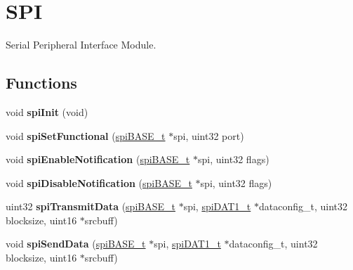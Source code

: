 \hypertarget{group__SPI}{}\section{S\+PI}
\label{group__SPI}


Serial Peripheral Interface Module.  


\subsection*{Functions}
\begin{DoxyCompactItemize}
\item 
\mbox{\label{group__SPI_ga3c484a97cdec02c5dbf46a11245e3395}} 
void {\bfseries spi\+Init} (void)
\item 
\mbox{\label{group__SPI_gaa5f0ffbb6cac3aa4ef1c5922d5be2a9e}} 
void {\bfseries spi\+Set\+Functional} (\mbox{\hyperlink{reg__spi_8h_af46e8a85339f9acf2cc93f22b3a0d1d7}{spi\+B\+A\+S\+E\+\_\+t}} $\ast$spi, uint32 port)
\item 
\mbox{\label{group__SPI_ga16b621b57dceb7630144fd336e226687}} 
void {\bfseries spi\+Enable\+Notification} (\mbox{\hyperlink{reg__spi_8h_af46e8a85339f9acf2cc93f22b3a0d1d7}{spi\+B\+A\+S\+E\+\_\+t}} $\ast$spi, uint32 flags)
\item 
\mbox{\label{group__SPI_gaa6ba09e2c9f89ff0e7ddeca878907c7b}} 
void {\bfseries spi\+Disable\+Notification} (\mbox{\hyperlink{reg__spi_8h_af46e8a85339f9acf2cc93f22b3a0d1d7}{spi\+B\+A\+S\+E\+\_\+t}} $\ast$spi, uint32 flags)
\item 
\mbox{\label{group__SPI_ga0ab8e0e4a0d6e246935f6e52f052291f}} 
uint32 {\bfseries spi\+Transmit\+Data} (\mbox{\hyperlink{reg__spi_8h_af46e8a85339f9acf2cc93f22b3a0d1d7}{spi\+B\+A\+S\+E\+\_\+t}} $\ast$spi, \mbox{\hyperlink{structspiDAT1RegConfig}{spi\+D\+A\+T1\+\_\+t}} $\ast$dataconfig\+\_\+t, uint32 blocksize, uint16 $\ast$srcbuff)
\item 
\mbox{\label{group__SPI_gac11e231fad39e20ceaa8ca1a45817fc9}} 
void {\bfseries spi\+Send\+Data} (\mbox{\hyperlink{reg__spi_8h_af46e8a85339f9acf2cc93f22b3a0d1d7}{spi\+B\+A\+S\+E\+\_\+t}} $\ast$spi, \mbox{\hyperlink{structspiDAT1RegConfig}{spi\+D\+A\+T1\+\_\+t}} $\ast$dataconfig\+\_\+t, uint32 blocksize, uint16 $\ast$srcbuff)

\end{DoxyCompactItemize}
